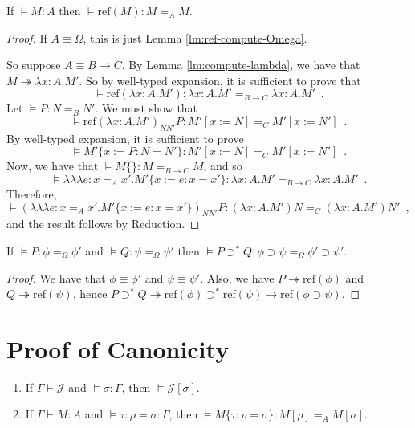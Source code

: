\documentclass[a4paper,UKenglish]{lipics-v2016}
\newcommand*{\reff}[1]{\ensuremath{\mathrm{ref} \left( {#1} \right)}}
\newcommand*{\triplelambda}{\ensuremath{\lambda \!\! \lambda \!\! \lambda}}
\theoremstyle{plain}
\begin{document}
\begin{lemma}
\label{lm:ref-compute}
If $\models M : A$ then $\models \reff{M} : M =_A M$.
\end{lemma}

\begin{proof}
If $A \equiv \Omega$, this is just Lemma \ref{lm:ref-compute-Omega}.

So suppose $A \equiv B \rightarrow C$.  By Lemma \ref{lm:compute-lambda}, we have that $M \twoheadrightarrow \lambda x:A.M'$.  So by well-typed expansion, it is sufficient to prove that
\[ \models \reff{\lambda x:A.M'} : \lambda x:A.M' =_{B \rightarrow C} \lambda x:A.M' \enspace . \]
Let $\models P : N =_B N'$.  We must show that
\[ \models \reff{\lambda x:A.M'}_{N N'} P : M' [x:= N] =_C M' [x:=N'] \enspace . \]
By well-typed expansion, it is sufficient to prove
\[ \models M' \{ x:= P : N = N' \} : M' [x:=N] =_C M' [x:= N'] \enspace . \]
Now, we have that $\models M \{\} : M =_{B \rightarrow C} M$, and so
\[ \models \triplelambda e : x =_A x' . M' \{ x := e : x = x' \} : \lambda x:A.M' =_{B \rightarrow C} \lambda x:A.M' \enspace . \]
Therefore,
\[ \models (\triplelambda e : x=_A x' . M' \{ x := e : x = x' \})_{N N'} P : (\lambda x:A.M') N =_C (\lambda x:A.M') N' \enspace , \]
and the result follows by Reduction.
\end{proof}

\begin{lemma}
\label{lm:compute-supset*}
If $\models P : \phi =_\Omega \phi'$ and $\models Q : \psi =_\Omega \psi'$ then $\models  P \supset^* Q : \phi \supset \psi =_\Omega \phi' \supset \psi'$.
\end{lemma}

\begin{proof}
We have that $\phi \equiv \phi'$ and $\psi \equiv \psi'$.  Also, we have $P \twoheadrightarrow \reff{\phi}$ and $Q \twoheadrightarrow \reff{\psi}$, hence
$P \supset^* Q \twoheadrightarrow \reff{\phi} \supset^* \reff{\psi} \rightarrow \reff{\phi \supset \psi}$. %
\end{proof}

\section{Proof of Canonicity}

\begin{theorem}
\begin{enumerate}
\item
If $\Gamma \vdash \mathcal{J}$ and $\models \sigma : \Gamma$, then $\models \mathcal{J} [ \sigma ]$.
\item
If $\Gamma \vdash M : A$ and $\models \tau : \rho = \sigma : \Gamma$, then $\models M \{ \tau : \rho = \sigma \} : M [ \rho ] =_A M [ \sigma ]$.
\end{enumerate}
\end{theorem}
\end{document}
